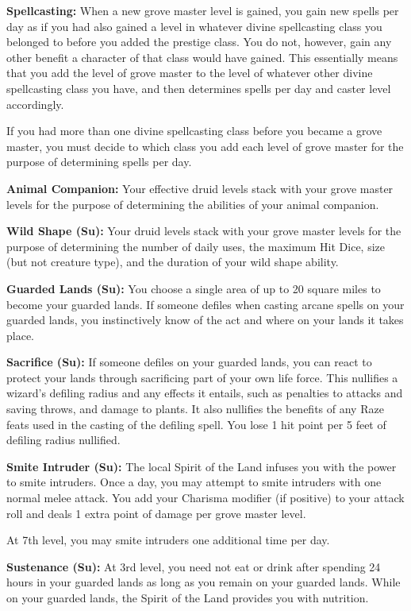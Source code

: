 {
\textbf{Spellcasting:} When a new grove master level is gained, you gain new spells per day as if you had also gained a level in whatever divine spellcasting class you belonged to before you added the prestige class. You do not, however, gain any other benefit a character of that class would have gained. This essentially means that you add the level of grove master to the level of whatever other divine spellcasting class you have, and then determines spells per day and caster level accordingly.

If you had more than one divine spellcasting class before you became a grove master, you must decide to which class you add each level of grove master for the purpose of determining spells per day.

\textbf{Animal Companion:} Your effective druid levels stack with your grove master levels for the purpose of determining the abilities of your animal companion.

\textbf{Wild Shape (Su):} Your druid levels stack with your grove master levels for the purpose of determining the number of daily uses, the maximum Hit Dice, size (but not creature type), and the duration of your wild shape ability.

\textbf{Guarded Lands (Su):} You choose a single area of up to 20 square miles to become your guarded lands. If someone defiles when casting arcane spells on your guarded lands, you instinctively know of the act and where on your lands it takes place.

\textbf{Sacrifice (Su):} If someone defiles on your guarded lands, you can react to protect your lands through sacrificing part of your own life force. This nullifies a wizard's defiling radius and any effects it entails, such as penalties to attacks and saving throws, and damage to plants. It also nullifies the benefits of any Raze feats used in the casting of the defiling spell. You lose 1 hit point per 5 feet of defiling radius nullified.

\textbf{Smite Intruder (Su):} The local Spirit of the Land infuses you with the power to smite intruders. Once a day, you may attempt to smite intruders with one normal melee attack. You add your Charisma modifier (if positive) to your attack roll and deals 1 extra point of damage per grove master level.

At 7th level, you may smite intruders one additional time per day.

\textbf{Sustenance (Su):} At 3rd level, you need not eat or drink after spending 24 hours in your guarded lands as long as you remain on your guarded lands. While on your guarded lands, the Spirit of the Land provides you with nutrition. 

}
